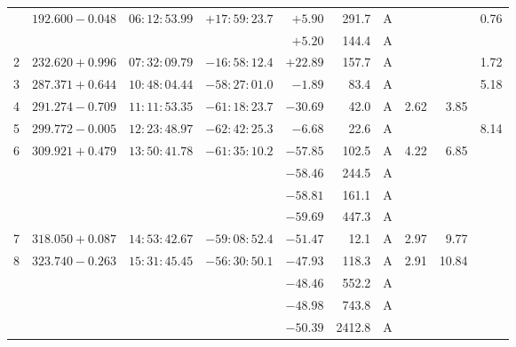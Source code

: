 {\begin{longtable}{l lll r r c rrr}
        \endlastfoot    
1    &  $192.600-0.048$   &  $06:12:53.99$    & $+17:59:23.7$    & $  +5.90 $ &   291.7&       A    &          &           &    0.76   \\
     &  $             $   &  $           $    & $           $    & $  +5.20 $ &   144.4&       A    &          &           &           \\
2    &  $232.620+0.996$   &  $07:32:09.79$    & $-16:58:12.4$    & $ +22.89 $ &   157.7&       A    &          &           &    1.72   \\
3    &  $287.371+0.644$   &  $10:48:04.44$    & $-58:27:01.0$    & $  -1.89 $ &    83.4&       A    &          &           &    5.18   \\
4    &  $291.274-0.709$   &  $11:11:53.35$    & $-61:18:23.7$    & $ -30.69 $ &    42.0&       A    &    2.62  &    3.85   &           \\
5    &  $299.772-0.005$   &  $12:23:48.97$    & $-62:42:25.3$    & $  -6.68 $ &    22.6&       A    &          &           &    8.14   \\
6    &  $309.921+0.479$   &  $13:50:41.78$    & $-61:35:10.2$    & $ -57.85 $ &   102.5&       A    &    4.22  &    6.85   &           \\
     &  $             $   &  $           $    & $           $    & $ -58.46 $ &   244.5&       A    &          &           &           \\
     &  $             $   &  $           $    & $           $    & $ -58.81 $ &   161.1&       A    &          &           &           \\
     &  $             $   &  $           $    & $           $    & $ -59.69 $ &   447.3&       A    &          &           &           \\
7    &  $318.050+0.087$   &  $14:53:42.67$    & $-59:08:52.4$    & $ -51.47 $ &    12.1&       A    &    2.97  &    9.77   &           \\
8    &  $323.740-0.263$   &  $15:31:45.45$    & $-56:30:50.1$    & $ -47.93 $ &   118.3&       A    &    2.91  &   10.84   &           \\
     &  $             $   &  $           $    & $           $    & $ -48.46 $ &   552.2&       A    &          &           &           \\
     &  $             $   &  $           $    & $           $    & $ -48.98 $ &   743.8&       A    &          &           &           \\
     &  $             $   &  $           $    & $           $    & $ -50.39 $ &  2412.8&       A    &          &           &           \\

\end{longtable}}

